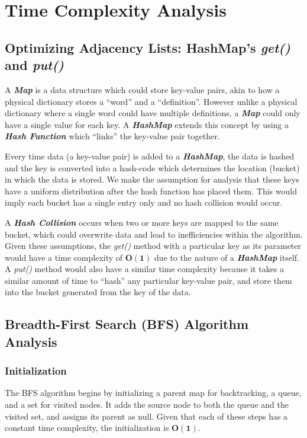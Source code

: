 \section*{\textbf{Time Complexity Analysis}}

\subsection*{\textbf{Optimizing Adjacency Lists: HashMap's \textit{get()} and \textit{put()}}}
A \textit{\textbf{Map}} is a data structure which could store key-value pairs, akin to how a physical dictionary stores a “word” and a “definition”. However unlike a physical dictionary where a single word could have multiple definitions, a \textit{\textbf{Map}} could only have a single value for each key. A \textit{\textbf{HashMap}} extends this concept by using a \textit{\textbf{Hash Function}} which “links” the key-value pair together.

Every time data (a key-value pair) is added to a \textit{\textbf{HashMap}}, the data is hashed and the key is converted into a hash-code which determines the location (bucket) in which the data is stored. We make the assumption for analysis that these keys have a uniform distribution after the hash function has placed them. This would imply each bucket has a single entry only and no hash collision would occur.

A \textit{\textbf{Hash Collision}} occurs when two or more keys are mapped to the same bucket, which could overwrite data and lead to inefficiencies within the algorithm. Given these assumptions, the \textit{get()} method with a particular key as its parameter would have a time complexity of $\mathbf{O(1)}$ due to the nature of a \textit{\textbf{HashMap}} itself. A \textit{put()} method would also have a similar time complexity because it takes a similar amount of time to “hash” any particular key-value pair, and store them into the bucket generated from the key of the data.

\subsection*{\textbf{Breadth-First Search (BFS) Algorithm Analysis}}

\subsubsection*{Initialization}
The BFS algorithm begins by initializing a parent map for backtracking, a queue, and a set for visited nodes. It adds the source node to both the queue and the visited set, and assigns its parent as null. Given that each of these steps has a constant time complexity, the initialization is $\mathbf{O(1)}$.

